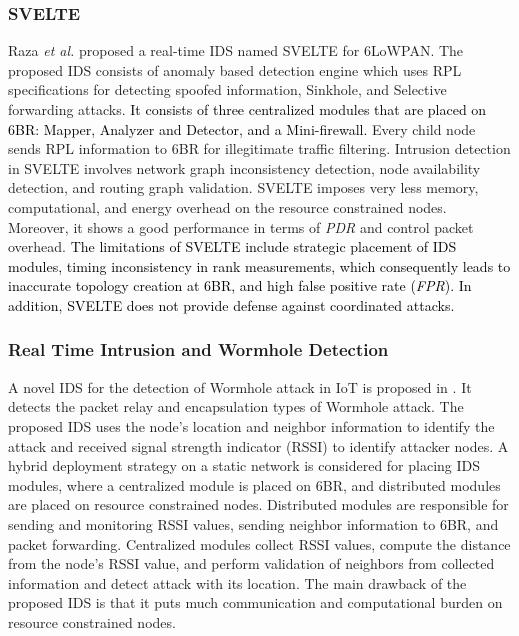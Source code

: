 \documentclass[10pt,journal,sort & compress]{IEEEtran}
\begin{document}
\subsubsection*{SVELTE}
Raza \textit{et al.} \cite{RAZA20132661} proposed a real-time IDS named SVELTE for $ 6 $LoWPAN. The proposed IDS consists of anomaly based detection engine which uses RPL specifications for detecting spoofed information, Sinkhole, and Selective forwarding attacks. \textcolor{black}{It consists of three centralized modules that are placed on 6BR: Mapper, Analyzer and Detector, and a Mini-firewall.} Every child node sends RPL information to $ 6 $BR for illegitimate traffic filtering. Intrusion detection in SVELTE involves network graph inconsistency detection, node availability detection, and routing graph validation. SVELTE imposes very less memory, computational, and energy overhead on the resource constrained nodes. Moreover, it shows a good performance in terms of \textit{PDR} and control packet overhead. \textcolor{black}{The limitations of SVELTE include strategic placement of IDS modules, timing inconsistency in rank measurements, which consequently leads to inaccurate topology creation at 6BR, and high false positive rate (\textit{FPR}). In addition, SVELTE does not provide defense against coordinated attacks. } 


\subsubsection*{Real Time Intrusion and Wormhole Detection}
A novel IDS for the detection of Wormhole attack in IoT is proposed in \cite{pongle2015real}. It detects the packet relay and encapsulation types of Wormhole attack. The proposed IDS uses the node's location and neighbor information to identify the attack and received signal strength indicator (RSSI) to identify attacker nodes. A hybrid deployment strategy on a static network is considered for placing IDS modules, where a centralized module is placed on 6BR, and distributed modules are placed on resource constrained nodes. Distributed modules are responsible for sending and monitoring RSSI values, sending neighbor information to 6BR, and packet forwarding. Centralized modules collect RSSI values, compute the distance from the node's RSSI value, and perform validation of neighbors from collected information and detect attack with its location.  The main drawback of the proposed IDS is that it puts much communication and computational burden on resource constrained nodes. 
\end{document}
